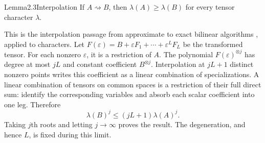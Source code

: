 \begin{result}{Lemma}{2.3}{Interpolation}
If $A\rightsquigarrow B$, then $\lambda(A)\ge\lambda(B)$ for every tensor character $\lambda$.
\end{result}
\begin{amsthmproof}
This is the interpolation passage from approximate to exact bilinear algorithms \cite{r3}, applied to characters. Let $F(\varepsilon)=B+\varepsilon F_1+\cdots+\varepsilon^L F_L$ be the transformed tensor. For each nonzero $\varepsilon$, it is a restriction of $A$. The polynomial $F(\varepsilon)^{\otimes j}$ has degree at most $jL$ and constant coefficient $B^{\otimes j}$. Interpolation at $jL+1$ distinct nonzero points writes this coefficient as a linear combination of specializations. A linear combination of tensors on common spaces is a restriction of their full direct sum: identify the corresponding variables and absorb each scalar coefficient into one leg. Therefore
\[\lambda(B)^j\le(jL+1)\lambda(A)^j.\]
Taking $j$th roots and letting $j\to\infty$ proves the result. The degeneration, and hence $L$, is fixed during this limit.
\end{amsthmproof}
